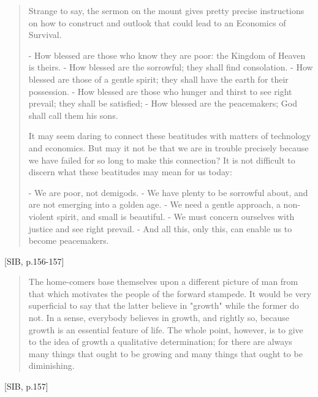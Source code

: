 \documentclass[letterpaper]{article}
\begin{document}
\begin{quote}
  Strange to say, the sermon on the mount gives pretty precise instructions on how to construct and outlook that could lead to an Economics of Survival.

  - How blessed are those who know they are poor: the Kingdom of Heaven is theirs.
  - How blessed are the sorrowful; they shall find consolation.
  - How blessed are those of a gentle spirit; they shall have the earth for their possession.
  - How blessed are those who hunger and thirst to see right prevail; they shall be satisfied;
  - How blessed are the peacemakers; God shall call them his sons.

  It may seem daring to connect these beatitudes with matters of technology and economics. But may it not be that we are in trouble precisely because we have failed for so long to make this connection? It is not difficult to discern what these beatitudes may mean for us today:

  - We are poor, not demigods.
  - We have plenty to be sorrowful about, and are not emerging into a golden age.
  - We need a gentle approach, a non-violent spirit, and small is beautiful.
  - We must concern ourselves with justice and see right prevail.
  - And all this, only this, can enable us to become peacemakers.
\end{quote}[SIB, p.156-157]

\begin{quote}
  The home-comers base themselves upon a different picture of man from that which motivates the people of the forward stampede. It would be very superficial to say that the latter believe in "growth" while the former do not. In a sense, everybody believes in growth, and rightly so, because growth is an essential feature of life. The whole point, however, is to give to the idea of growth a qualitative determination; for there are always many things that ought to be growing and many things that ought to be diminishing.
\end{quote}[SIB, p.157]
\end{document}
